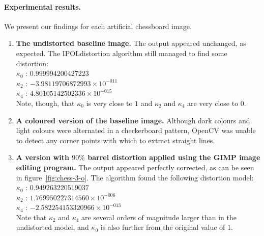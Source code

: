 \paragraph{Experimental results.}
We present our findings for each artificial chessboard image.
\begin{enumerate}
  \item \textbf{The undistorted baseline image.} The output appeared unchanged, as expected. The IPOLdistortion algorithm still managed to find some distortion:\\
   $ \kappa_{0}$ : $0.999994200427223$\\
   $ \kappa_{2}$ : $-3.98119706872993 \times 10^{-011}$\\
   $ \kappa_{4}$ : $4.80105142502336 \times 10^{-015}$\\
   Note, though, that $\kappa_{0}$ is very close to $1$ and $\kappa_{2}$ and $\kappa_{4}$ are very close to $0$.
  \item \textbf{A coloured version of the baseline image.} Although dark colours and light colours were alternated in a checkerboard pattern, OpenCV was unable to detect any corner points with which to extract straight lines.
  \item \textbf{A version with $90\%$ barrel distortion applied using the GIMP image editing program.} The output appeared perfectly corrected, as can be seen in figure~\ref{fig:chess-3-o}. The algorithm found the following distortion model:\\
   $ \kappa_{0}$ : $0.949263220519037$\\
   $ \kappa_{2}$ : $1.769950227314560 \times 10^{-006}$\\
   $ \kappa_{4}$ : $-2.582254153320966 \times 10^{-013}$\\
   Note that $\kappa_{2}$ and $\kappa_{4}$ are several orders of magnitude larger than in the undistorted model, and $\kappa_{0}$ is also further from the original value of $1$.
\begin{figure}[H]
  \centering

\end{figure}
\end{enumerate}
